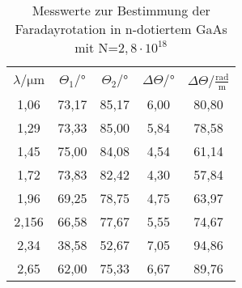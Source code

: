 \begin{table}[H]
  \centering
  \caption{Messwerte zur Bestimmung der Faradayrotation in n-dotiertem GaAs mit N=$2,8\cdot10^{18}$}
  \label{tab:tabe4}
    \begin{tabular}{S S S S S}
    \toprule \\
    {$\lambda / \si{\micro\metre} $} & {$\Theta_1 /° $} & {$\Theta_2 /° $} & {$\Delta \Theta /° $} &
    {$\Delta \Theta / \frac{\text{rad}}{\text{m}} $}\\
    ,06 & 73,17 & 85,17 & 6,00 & 80,80 \\
    1,29 & 73,33 & 85,00 & 5,84 & 78,58 \\
    1,45 & 75,00 & 84,08 & 4,54 & 61,14 \\
    1,72 & 73,83 & 82,42 & 4,30 & 57,84 \\
    1,96 & 69,25 & 78,75 & 4,75 & 63,97 \\
    2,156 & 66,58 & 77,67 & 5,55 & 74,67 \\
    2,34 & 38,58 & 52,67 & 7,05 & 94,86 \\
    2,65 & 62,00 & 75,33 & 6,67 & 89,76 \\



          \bottomrule
        \end{tabular}
\end{table}
